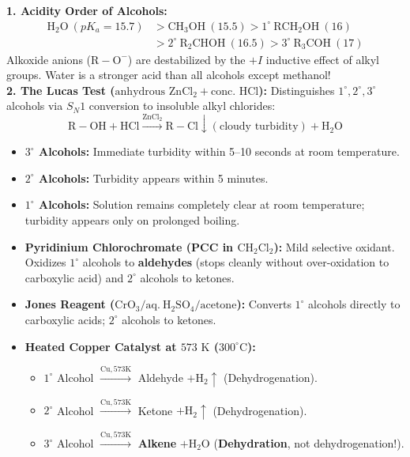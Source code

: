 \documentclass[10pt,twoside,openright]{book}
\begin{document}
\begin{conceptbox}
\textbf{1. Acidity Order of Alcohols:}
\begin{align}
  \mathrm{H_2O} \ (pK_a = 15.7) &> \mathrm{CH_3OH} \ (15.5) > 1^\circ \ \mathrm{RCH_2OH} \ (16) \\
  &> 2^\circ \ \mathrm{R_2CHOH} \ (16.5) > 3^\circ \ \mathrm{R_3COH} \ (17)
\end{align}
Alkoxide anions ($\mathrm{R-O^-}$) are destabilized by the $+I$ inductive effect of alkyl groups. Water is a stronger acid than all alcohols except methanol!\\
\textbf{2. The Lucas Test ($\text{anhydrous } \mathrm{ZnCl_2} + \text{conc. } \mathrm{HCl}$):}
Distinguishes $1^\circ, 2^\circ, 3^\circ$ alcohols via $S_N1$ conversion to insoluble alkyl chlorides:
\begin{equation}
  \mathrm{R-OH} + \mathrm{HCl} \xrightarrow{\mathrm{ZnCl_2}} \mathrm{R-Cl}\downarrow (\text{cloudy turbidity}) + \mathrm{H_2O}
\end{equation}
\begin{itemize}
  \item \textbf{$3^\circ$ Alcohols:} Immediate turbidity within 5--10 seconds at room temperature.
  \item \textbf{$2^\circ$ Alcohols:} Turbidity appears within 5 minutes.
  \item \textbf{$1^\circ$ Alcohols:} Solution remains completely clear at room temperature; turbidity appears only on prolonged boiling.
\end{itemize}
\end{conceptbox}

\begin{usecasebox}
\begin{itemize}
  \item \textbf{Pyridinium Chlorochromate (PCC in $\mathrm{CH_2Cl_2}$):} Mild selective oxidant. Oxidizes $1^\circ$ alcohols to \textbf{aldehydes} (stops cleanly without over-oxidation to carboxylic acid) and $2^\circ$ alcohols to ketones.
  \item \textbf{Jones Reagent ($\mathrm{CrO_3 / aq.\ H_2SO_4 / \text{acetone}}$):} Converts $1^\circ$ alcohols directly to carboxylic acids; $2^\circ$ alcohols to ketones.
  \item \textbf{Heated Copper Catalyst at $573\text{ K}$ ($300^\circ\text{C}$):}
  \begin{itemize}
    \item $1^\circ$ Alcohol $\xrightarrow{\mathrm{Cu, 573 K}}$ Aldehyde $+ \mathrm{H_2}\uparrow$ (Dehydrogenation).
    \item $2^\circ$ Alcohol $\xrightarrow{\mathrm{Cu, 573 K}}$ Ketone $+ \mathrm{H_2}\uparrow$ (Dehydrogenation).
    \item $3^\circ$ Alcohol $\xrightarrow{\mathrm{Cu, 573 K}}$ \textbf{Alkene} $+ \mathrm{H_2O}$ (\textbf{Dehydration}, not dehydrogenation!).
  \end{itemize}
\end{itemize}
\end{usecasebox}
\end{document}
